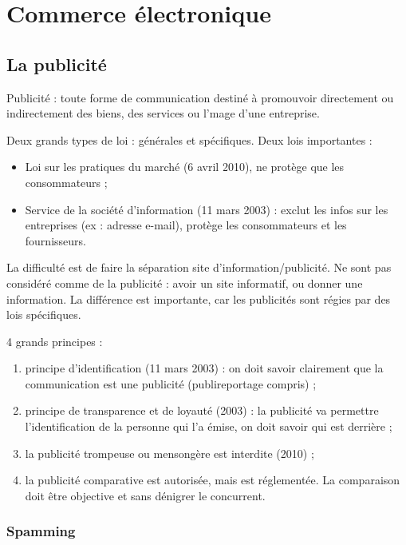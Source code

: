\chapter{Commerce électronique}

	\section{La publicité}
	
	Publicité : toute forme de communication destiné à promouvoir directement ou indirectement des biens, des services ou l'mage d'une entreprise.
	
	Deux grands types de loi : générales et spécifiques. Deux lois importantes :
	
	\begin{itemize}
		\item Loi sur les pratiques du marché (6 avril 2010), ne protège que les consommateurs ;
		\item Service de la société d'information (11 mars 2003) : exclut les infos sur les entreprises (ex : adresse e-mail), protège les consommateurs et les fournisseurs.
	\end{itemize}
	
	La difficulté est de faire la séparation site d'information/publicité. Ne sont pas considéré comme de la publicité : avoir un site informatif, ou donner une information. La différence est importante, car les publicités sont régies par des lois spécifiques.
	
	4 grands principes :
	
	\begin{enumerate}
		\item principe d'identification (11 mars 2003) : on doit savoir clairement que la communication est une publicité (publireportage compris) ;
		\item principe de transparence et de loyauté (2003) : la publicité va permettre l'identification de la personne qui l'a émise, on doit savoir qui est derrière ;
		\item la publicité trompeuse ou mensongère est interdite (2010) ;
		\item la publicité comparative est autorisée, mais est réglementée. La comparaison doit être objective et sans dénigrer le concurrent.
	\end{enumerate}
	
		\subsection{Spamming}
			

